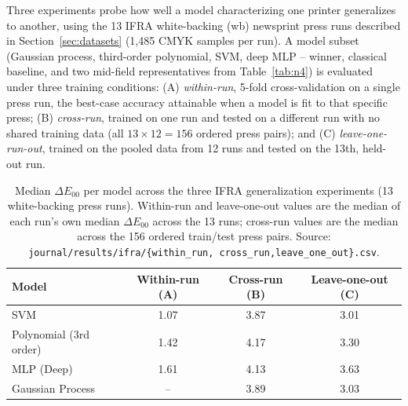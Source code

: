 \documentclass[11pt,a4paper]{article}
\begin{document}
Three experiments probe how well a model characterizing one printer
generalizes to another, using the 13 IFRA white-backing (wb) newsprint press
runs described in Section~\ref{sec:datasets} (1{,}485 CMYK samples per run).
A model subset (Gaussian process, third-order polynomial, SVM, deep MLP --
winner, classical baseline, and two mid-field representatives from
Table~\ref{tab:n4}) is evaluated under three training conditions: (A)
\emph{within-run}, 5-fold cross-validation on a single press run, the
best-case accuracy attainable when a model is fit to that specific press;
(B) \emph{cross-run}, trained on one run and tested on a different run with
no shared training data (all $13\times12=156$ ordered press pairs); and (C)
\emph{leave-one-run-out}, trained on the pooled data from 12 runs and tested
on the 13th, held-out run.

\begin{table}[h]
\centering
\caption{Median $\Delta E_{00}$ per model across the three IFRA
generalization experiments (13 white-backing press runs). Within-run and
leave-one-out values are the median of each run's own median $\Delta E_{00}$
across the 13 runs; cross-run values are the median across the 156 ordered
train/test press pairs. Source: \texttt{journal/results/ifra/\{within\_run,
cross\_run,leave\_one\_out\}.csv}.}
\label{tab:ifra}
\begin{tabular}{@{}lccc@{}}
\toprule
Model & Within-run (A) & Cross-run (B) & Leave-one-out (C) \\
\midrule
SVM & 1.07 & 3.87 & 3.01 \\
Polynomial (3rd order) & 1.42 & 4.17 & 3.30 \\
MLP (Deep) & 1.61 & 4.13 & 3.63 \\
Gaussian Process & --\footnotemark & 3.89 & 3.03 \\
\bottomrule
\end{tabular}
\end{table}
\end{document}
